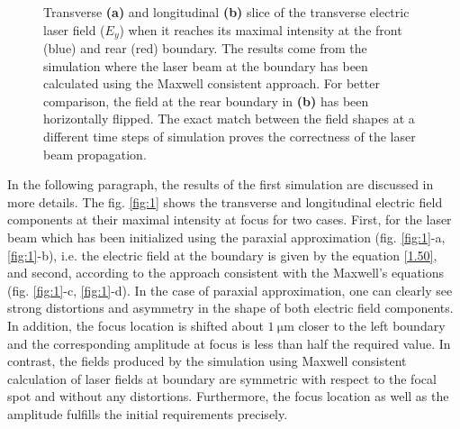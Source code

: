 \begin{figure}[h!]
	\centering
	\hspace{1mm}
	\caption{Transverse \textbf{(a)} and longitudinal \textbf{(b)} slice of the transverse electric laser field ($ E_{y} $) when it reaches its maximal intensity at the front (blue) and rear (red) boundary. The results come from the simulation where the laser beam at the boundary has been calculated using the Maxwell consistent approach. For better comparison, the field at the rear boundary in \textbf{(b)} has been horizontally flipped. The exact match between the field shapes at a different time steps of simulation proves the correctness of the laser beam propagation.}
	\label{fig:4}
\end{figure}

In the following paragraph, the results of the first simulation are discussed in more details. The fig. \ref{fig:1} shows the transverse and longitudinal electric field components at their maximal intensity at focus for two cases. First, for the laser beam which has been initialized using the paraxial approximation (fig. \ref{fig:1}-a, \ref{fig:1}-b), i.e. the electric field at the boundary is given by the equation \ref{1.50}, and second, according to the approach consistent with the Maxwell's equations (fig. \ref{fig:1}-c, \ref{fig:1}-d). In the case of paraxial approximation, one can clearly see strong distortions and asymmetry in the shape of both electric field components. In addition, the focus location is shifted about $ 1 \ \mathrm{\mu m} $ closer to the left boundary and the corresponding amplitude at focus is less than half the required value. In contrast, the fields produced by the simulation using Maxwell consistent calculation of laser fields at boundary are symmetric with respect to the focal spot and without any distortions. Furthermore, the focus location as well as the amplitude fulfills the initial requirements precisely.

